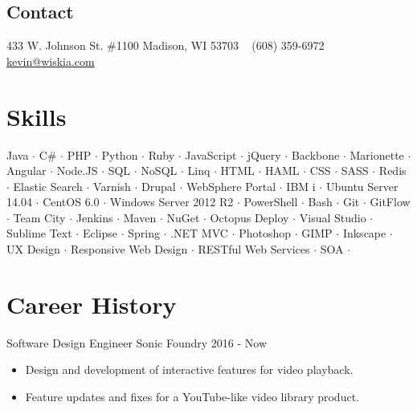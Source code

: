\documentclass[]{clean-resume}
\begin{document}



\begin{aside}
  \section{Contact}
    433 W. Johnson St. \#1100
	Madison, WI 53703
    ~
    (608) 359-6972
    \href{mailto:kevin@wiskia.com.com?subject=Resume}{kevin@wiskia.com}
\end{aside}


\section{Skills}

\begin{centering}
{ \small
	Java $\cdot$
	C\# $\cdot$
	PHP $\cdot$
	Python $\cdot$
	Ruby $\cdot$
	JavaScript $\cdot$
	jQuery $\cdot$
	Backbone $\cdot$
	Marionette $\cdot$
	Angular $\cdot$
	Node.JS $\cdot$
	SQL $\cdot$
	NoSQL $\cdot$
	Linq $\cdot$
	HTML $\cdot$
	HAML $\cdot$
	CSS $\cdot$
	SASS $\cdot$
	Redis $\cdot$
	Elastic Search $\cdot$
	Varnish $\cdot$
	Drupal $\cdot$
	WebSphere Portal $\cdot$
	IBM i $\cdot$
	Ubuntu Server 14.04 $\cdot$
	CentOS 6.0 $\cdot$
	Windows Server 2012 R2 $\cdot$
	PowerShell $\cdot$
	Bash $\cdot$
	Git $\cdot$
	GitFlow $\cdot$
	Team City $\cdot$
	Jenkins $\cdot$
	Maven $\cdot$
	NuGet $\cdot$
	Octopus Deploy $\cdot$
	Visual Studio $\cdot$
	Sublime Text $\cdot$
	Eclipse $\cdot$
	Spring $\cdot$
	.NET MVC $\cdot$
	Photoshop $\cdot$
	GIMP $\cdot$
	Inkscape $\cdot$
	UX Design $\cdot$
	Responsive Web Design $\cdot$
	RESTful Web Services $\cdot$
	SOA $\cdot$
}
\end{centering}

\section{Career History}

\entry
	{Software Design Engineer}
	{Sonic Foundry}
	{2016 - Now}
	{
		\begin{itemize}
			\item Design and development of interactive features for video playback.
			\item Feature updates and fixes for a YouTube-like video library product.
		\end{itemize}
	}
\end{document}
